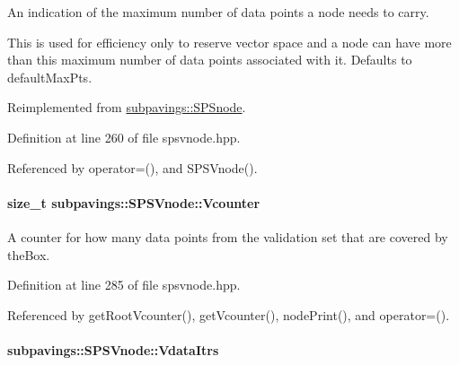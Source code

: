 \-An indication of the maximum number of data points a node needs to carry. 

\-This is used for efficiency only to reserve vector space and a node can have more than this maximum number of data points associated with it. \-Defaults to default\-Max\-Pts. 

\-Reimplemented from \hyperlink{classsubpavings_1_1SPSnode_a4d836fd2b3cd074343475de6f9511c95}{subpavings\-::\-S\-P\-Snode}.



\-Definition at line 260 of file spsvnode.\-hpp.



\-Referenced by operator=(), and \-S\-P\-S\-Vnode().

\hypertarget{classsubpavings_1_1SPSVnode_a5d0154d5c5d30fa214b8a2d9deedee12}{
\paragraph[{\-Vcounter}]{\setlength{\rightskip}{0pt plus 5cm}size\-\_\-t {\bf subpavings\-::\-S\-P\-S\-Vnode\-::\-Vcounter}}}\label{classsubpavings_1_1SPSVnode_a5d0154d5c5d30fa214b8a2d9deedee12}


\-A counter for how many data points from the validation set that are covered by the\-Box. 



\-Definition at line 285 of file spsvnode.\-hpp.



\-Referenced by get\-Root\-Vcounter(), get\-Vcounter(), node\-Print(), and operator=().

\hypertarget{classsubpavings_1_1SPSVnode_a0e6c6ea9c454b9ce280915b59c7f3647}{
\paragraph[{\-Vdata\-Itrs}]{ {\bf subpavings\-::\-S\-P\-S\-Vnode\-::\-Vdata\-Itrs}}}\label{classsubpavings_1_1SPSVnode_a0e6c6ea9c454b9ce280915b59c7f3647}


